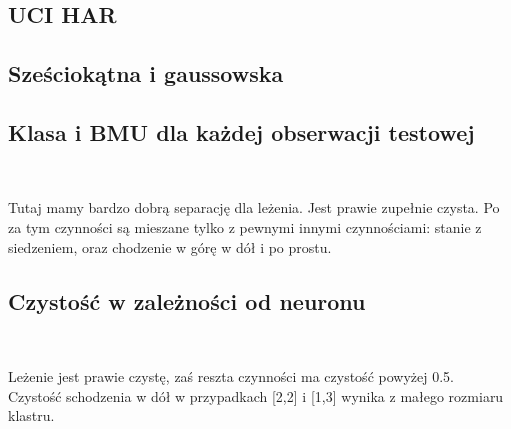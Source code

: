 \documentclass[11pt]{article}
\begin{document}
    \hypertarget{uci-har}{%
\subsection{UCI HAR}\label{uci-har}}

    \hypertarget{szeux15bciokux105tna-i-gaussowska}{%
\subsection{Sześciokątna i
gaussowska}\label{szeux15bciokux105tna-i-gaussowska}}

    \hypertarget{klasa-i-bmu-dla-kaux17cdej-obserwacji-testowej}{%
\subsection{Klasa i BMU dla każdej obserwacji
testowej}\label{klasa-i-bmu-dla-kaux17cdej-obserwacji-testowej}}

           
        
    \begin{center}
    \end{center}
    { \hspace*{\fill} \\}
    
    Tutaj mamy bardzo dobrą separację dla leżenia. Jest prawie zupełnie
czysta. Po za tym czynności są mieszane tylko z pewnymi innymi
czynnościami: stanie z siedzeniem, oraz chodzenie w górę w dół i po
prostu.

    \hypertarget{czystoux15bux107-w-zaleux17cnoux15bci-od-neuronu}{%
\subsection{Czystość w zależności od
neuronu}\label{czystoux15bux107-w-zaleux17cnoux15bci-od-neuronu}}

            
        
    \begin{center}
    \end{center}
    { \hspace*{\fill} \\}
    
    Leżenie jest prawie czystę, zaś reszta czynności ma czystość powyżej
0.5. Czystość schodzenia w dół w przypadkach {[}2,2{]} i {[}1,3{]}
wynika z małego rozmiaru klastru.
\end{document}
